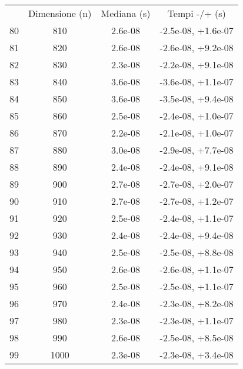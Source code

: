 \begin{table}
\centering
\begin{adjustbox}{width=1\textwidth/2}
\begin{tabular}{|c|c|c|c|}
\hline
 & Dimensione (n) & Mediana (s) & Tempi -/+ (s) \\
80 & 810 & 2.6e-08 & -2.5e-08, +1.6e-07 \\
\cline{1-4}
81 & 820 & 2.6e-08 & -2.6e-08, +9.2e-08 \\
\cline{1-4}
82 & 830 & 2.3e-08 & -2.2e-08, +9.1e-08 \\
\cline{1-4}
83 & 840 & 3.6e-08 & -3.6e-08, +1.1e-07 \\
\cline{1-4}
84 & 850 & 3.6e-08 & -3.5e-08, +9.4e-08 \\
\cline{1-4}
85 & 860 & 2.5e-08 & -2.4e-08, +1.0e-07 \\
\cline{1-4}
86 & 870 & 2.2e-08 & -2.1e-08, +1.0e-07 \\
\cline{1-4}
87 & 880 & 3.0e-08 & -2.9e-08, +7.7e-08 \\
\cline{1-4}
88 & 890 & 2.4e-08 & -2.4e-08, +9.1e-08 \\
\cline{1-4}
89 & 900 & 2.7e-08 & -2.7e-08, +2.0e-07 \\
\cline{1-4}
90 & 910 & 2.7e-08 & -2.7e-08, +1.2e-07 \\
\cline{1-4}
91 & 920 & 2.5e-08 & -2.4e-08, +1.1e-07 \\
\cline{1-4}
92 & 930 & 2.4e-08 & -2.4e-08, +9.4e-08 \\
\cline{1-4}
93 & 940 & 2.5e-08 & -2.5e-08, +8.8e-08 \\
\cline{1-4}
94 & 950 & 2.6e-08 & -2.6e-08, +1.1e-07 \\
\cline{1-4}
95 & 960 & 2.5e-08 & -2.5e-08, +1.1e-07 \\
\cline{1-4}
96 & 970 & 2.4e-08 & -2.3e-08, +8.2e-08 \\
\cline{1-4}
97 & 980 & 2.3e-08 & -2.3e-08, +1.1e-07 \\
\cline{1-4}
98 & 990 & 2.6e-08 & -2.5e-08, +8.5e-08 \\
\cline{1-4}
99 & 1000 & 2.3e-08 & -2.3e-08, +3.4e-08 \\
\cline{1-4}
\end{tabular}
\end{adjustbox}
\end{table}


